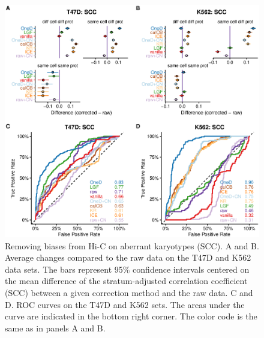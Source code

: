 \documentclass[12pt]{report}
\begin{document}
\begin{figure}
	\centerline{\includegraphics[width=\textwidth]{nar_figures/supp_figure_6.eps}}
    \caption{
    Removing biases from Hi-C on aberrant karyotypes (SCC). A and B. Average changes
    compared to the raw data on the T47D and K562 data sets. The bars represent
    95\% confidence intervals centered on the mean difference of the
    stratum-adjusted correlation coefficient (SCC) between a given correction method and the raw data. C
    and D. ROC curves on the T47D and K562 sets. The areas under the curve are
    indicated in the bottom right corner. The color code is the same as in panels A and B.}
\end{figure}
\end{document}
